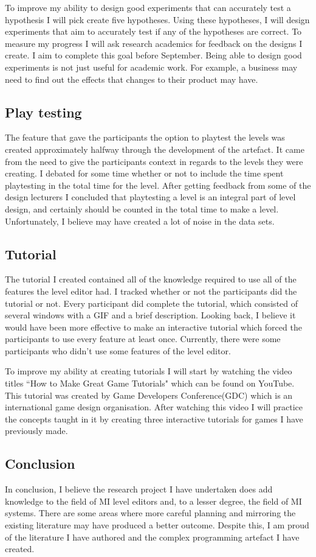 \documentclass[journal]{IEEEtran}
\begin{document}
To improve my ability to design good experiments that can accurately test a hypothesis I will pick create five hypotheses. Using these hypotheses, I will design experiments that aim to accurately test if any of the hypotheses are correct. To measure my progress I will ask research academics for feedback on the designs I create. I aim to complete this goal before September. Being able to design good experiments is not just useful for academic work. For example, a business may need to find out the effects that changes to their product may have.

\subsection{Play testing}\label{ptest}
The feature that gave the participants the option to playtest the levels was created approximately halfway through the development of the artefact. It came from the need to give the participants context in regards to the levels they were creating. I debated for some time whether or not to include the time spent playtesting in the total time for the level. After getting feedback from some of the design lecturers I concluded that playtesting a level is an integral part of level design, and certainly should be counted in the total time to make a level. Unfortunately, I believe may have created a lot of noise in the data sets. 

\subsection{Tutorial}
The tutorial I created contained all of the knowledge required to use all of the features the level editor had. I tracked whether or not the participants did the tutorial or not. Every participant did complete the tutorial, which consisted of several windows with a GIF and a brief description. Looking back, I believe it would have been more effective to make an interactive tutorial which forced the participants to use every feature at least once. Currently, there were some participants who didn't use some features of the level editor.

To improve my ability at creating tutorials I will start by watching the video titles ``How to Make Great Game Tutorials" which can be found on YouTube. This tutorial was created by Game Developers Conference(GDC) which is an international game design organisation. After watching this video I will practice the concepts taught in it by creating three interactive tutorials for games I have previously made. 

\subsection{Conclusion}
In conclusion, I believe the research project I have undertaken does add knowledge to the field of MI level editors and, to a lesser degree, the field of MI systems. There are some areas where more careful planning and mirroring the existing literature may have produced a better outcome. Despite this, I am proud of the literature I have authored and the complex programming artefact I have created.

\end{document}
